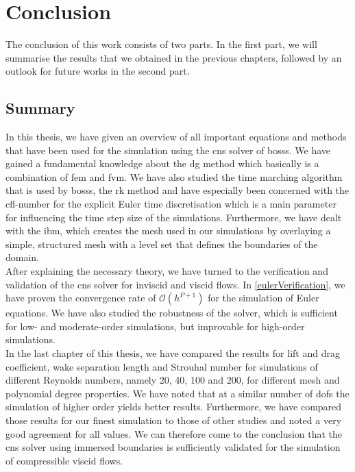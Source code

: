 \chapter{Conclusion}

The conclusion of this work consists of two parts. In the first part, we will summarise the results that we obtained in the previous chapters, followed by an outlook for future works in the second part. 

\section{Summary}
In this thesis, we have given an overview of all important equations and methods that have been used for the simulation using the \gls{cns} solver of \gls{bosss}. We have gained a fundamental knowledge about the \gls{dg} method which basically is a combination of \gls{fem} and \gls{fvm}. We have also studied the time marching algorithm that is used by \gls{bosss}, the \gls{rk} method and have especially been concerned with the \gls{cfl}-number for the explicit Euler time discretisation which is a main parameter for influencing the time step size of the simulations. Furthermore, we have dealt with the \gls{ibm}, which creates the mesh used in our simulations by overlaying a simple, structured mesh with a level set that defines the boundaries of the domain. \\\indent
After explaining the necessary theory, we have turned to the verification and validation of the \gls{cns} solver for inviscid and viscid flows. In \cref{eulerVerification}, we have proven the convergence rate of $\mathcal{O}(h^{P+1})$ for the simulation of Euler equations. We have also studied the robustness of the solver, which is sufficient for low- and moderate-order simulations, but improvable for high-order simulations.\\\indent
In the last chapter of this thesis, we have compared the results for lift and drag coefficient, wake separation length and Strouhal number for simulations of different Reynolds numbers, namely 20, 40, 100 and 200, for different mesh and polynomial degree properties. We have noted that at a similar number of \gls{dof}s the simulation of higher order yields better results. Furthermore, we have compared those results for our finest simulation to those of other studies and noted a very good agreement for all values. We can therefore come to the conclusion that the \gls{cns} solver using immersed boundaries is sufficiently validated for the simulation of compressible viscid flows. 

